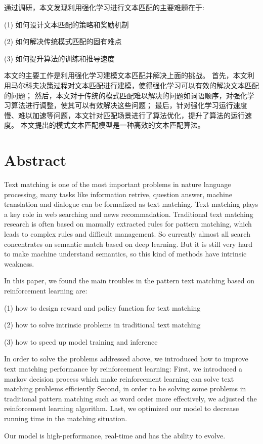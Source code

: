 通过调研，本文发现利用强化学习进行文本匹配的主要难题在于:

(1) 如何设计文本匹配的策略和奖励机制

(2) 如何解决传统模式匹配的固有难点

(3) 如何提升算法的训练和推导速度

本文的主要工作是利用强化学习建模文本匹配并解决上面的挑战。
首先，本文利用马尔科夫决策过程对文本匹配进行建模，使得强化学习可以有效的解决文本匹配的问题；
然后，本文对于传统的模式匹配难以解决的问题如词语顺序，对强化学习算法进行调整，使其可以有效解决这些问题；
最后，针对强化学习运行速度慢、难以加速等问题，本文针对匹配场景进行了算法优化，提升了算法的运行速度。
本文提出的模式文本匹配模型是一种高效的文本匹配算法。

\chapter*{Abstract}

Text matching is one of the most important problems in nature language processing, many tasks like information retrive, question answer, machine translation and dialogue can be formalized as text matching.
Text matching plays a key role in web searching and news recommadation.
Traditional text matching research is often based on manually extracted rules for pattern matching, which leads to complex rules and difficult management. So currently almost all search concentrates on semantic match based on deep learning. But it is still very hard to make machine understand semantics, so this kind of methods have intrinsic weakness.

In this paper, we found the main troubles in the pattern text matching based on reinforcement learning are:

(1) how to design reward and policy function for text matching

(2) how to solve intrinsic problems in traditional text matching

(3) how to speed up model training and inference

In order to solve the problems addressed above, we introduced how to improve text matching performance by reinforcement learning:
First, we introduced a markov decision process which make reinforcement learning can solve text matching problems efficiently
Second, in order to be solving some problems in traditional pattern matching such as word order more effectively, we adjusted the reinforcement learning algorithm.
Last, we optimized our model to decrease running time in the matching situation.

Our model is high-performance, real-time and has the ability to evolve.

